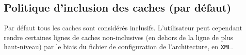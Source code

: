 \subsection{Politique d'inclusion des caches (par défaut)}

Par défaut tous les caches sont considérés inclusifs. L'utilisateur peut cependant rendre certaines lignes de caches non-inclusives (en dehors de la ligne de plus haut-niveau) par le biais du fichier de configuration de l'architecture, en \texttt{XML}.

